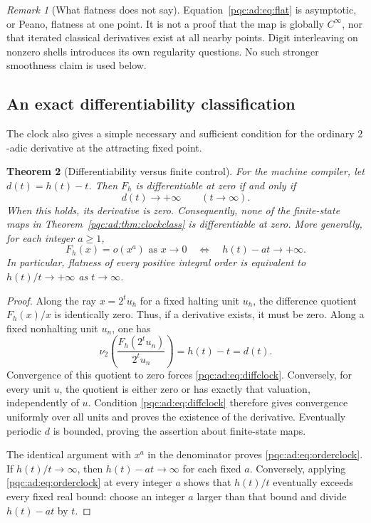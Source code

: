 \documentclass[11pt,letterpaper]{article}
\numberwithin{equation}{section}
\newtheorem{theorem}{Theorem}[section]
\theoremstyle{definition}
\theoremstyle{remark}
\newtheorem{remark}[theorem]{Remark}
\newcommand{\nuu}{\nu_2}
\begin{document}
\begin{remark}[What flatness does not say]
Equation~\eqref{pqc:ad:eq:flat} is asymptotic, or Peano, flatness at one point. It
is not a proof that the map is globally $C^\infty$, nor that iterated
classical derivatives exist at all nearby points. Digit interleaving on
nonzero shells introduces its own regularity questions. No such stronger
smoothness claim is used below.
\end{remark}

\subsection{An exact differentiability classification}
The clock also gives a simple necessary and sufficient condition for the
ordinary $2$-adic derivative at the attracting fixed point.

\begin{theorem}[Differentiability versus finite control]\label{pqc:ad:thm:derivative}
For the machine compiler, let $d(t)=h(t)-t$. Then $F_h$ is differentiable
at zero if and only if
\begin{equation}\label{pqc:ad:eq:diffclock}
d(t)\longrightarrow+\infty\qquad(t\longrightarrow\infty).
\end{equation}
When this holds, its derivative is zero. Consequently, none of the
finite-state maps in Theorem~\ref{pqc:ad:thm:clockclass} is differentiable at zero.
More generally, for each integer $a\ge1$,
\begin{equation}\label{pqc:ad:eq:orderclock}
F_h(x)=o(x^a)\text{ as }x\to0
\quad\Longleftrightarrow\quad
h(t)-at\longrightarrow+\infty.
\end{equation}
In particular, flatness of every positive integral order is equivalent to
$h(t)/t\to+\infty$ as $t\to\infty$.
\end{theorem}
\begin{proof}
Along the ray $x=2^t u_h$ for a fixed halting unit $u_h$, the difference
quotient $F_h(x)/x$ is identically zero. Thus, if a derivative exists, it
must be zero. Along a fixed nonhalting unit $u_n$, one has
\[
\nuu\!\left(\frac{F_h(2^tu_n)}{2^tu_n}\right)=h(t)-t=d(t).
\]
Convergence of this quotient to zero forces \eqref{pqc:ad:eq:diffclock}.
Conversely, for every unit $u$, the quotient is either zero or has exactly
that valuation, independently of $u$. Condition \eqref{pqc:ad:eq:diffclock}
therefore gives convergence uniformly over all units and proves the
existence of the derivative. Eventually periodic $d$ is bounded, proving
the assertion about finite-state maps.

The identical argument with $x^a$ in the denominator proves
\eqref{pqc:ad:eq:orderclock}. If $h(t)/t\to\infty$, then $h(t)-at\to\infty$
for each fixed $a$. Conversely, applying \eqref{pqc:ad:eq:orderclock} at every
integer $a$ shows that $h(t)/t$ eventually exceeds every fixed real bound:
choose an integer $a$ larger than that bound and divide $h(t)-at$ by $t$.
\end{proof}
\end{document}
